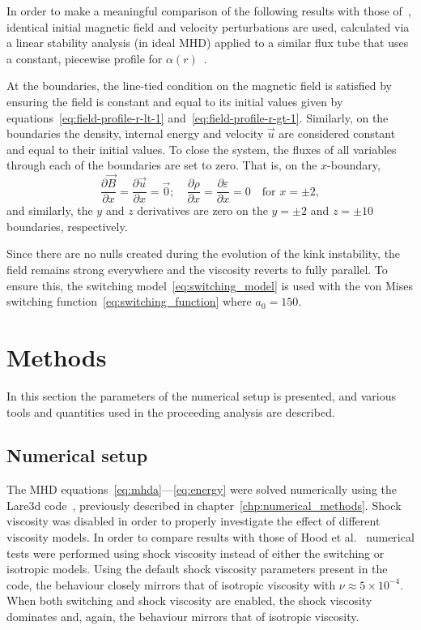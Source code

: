 In order to make a meaningful comparison of the following results with those of~\cite{hoodCoronalHeatingMagnetic2009}, identical initial magnetic field and velocity perturbations are used, calculated via a linear stability analysis (in ideal MHD) applied to a similar flux tube that uses a constant, piecewise profile for $\alpha(r)$~\cite{vanderlindenCompleteCoronalLoop1999,browningSolarCoronalHeating2003c,browningHeatingCoronaNanoflares2008a}.

At the boundaries, the line-tied condition on the magnetic field is satisfied by ensuring the field is constant and equal to its initial values given by equations~\eqref{eq:field-profile-r-lt-1} and~\eqref{eq:field-profile-r-gt-1}. Similarly, on the boundaries the density, internal energy and velocity $\vec{u}$ are considered constant and equal to their initial values. To close the system, the fluxes of all variables through each of the boundaries are set to zero. That is, on the $x$-boundary,
\begin{equation}
  \frac{\partial \vec{B}}{\partial x} = \frac{\partial \vec{u}}{\partial x} = \vec{0}; \quad \frac{\partial \rho}{\partial x} = \frac{\partial \varepsilon}{\partial x} = 0 \quad \text{for } x=\pm 2,
\end{equation}
and similarly, the $y$ and $z$ derivatives are zero on the $y=\pm2$ and $z=\pm10$ boundaries, respectively.

Since there are no nulls created during the evolution of the kink instability, the field remains strong everywhere and the viscosity reverts to fully parallel. To ensure this, the switching model~\eqref{eq:switching_model} is used with the von Mises switching function~\eqref{eq:switching_function} where $a_0 = 150$. 

\section{Methods}
\label{sec:general-numerical-setup}

In this section the parameters of the numerical setup is presented, and various tools and quantities used in the proceeding analysis are described.

\subsection{Numerical setup}

The MHD equations~\eqref{eq:mhda}---\eqref{eq:energy} were solved numerically using the Lare3d code~\cite{arberStaggeredGridLagrangian2001}, previously described in chapter~\ref{chp:numerical_methods}. Shock viscosity was disabled in order to properly investigate the effect of different viscosity models. In order to compare results with those of Hood et al.~\cite{hoodCoronalHeatingMagnetic2009} numerical tests were performed using shock viscosity instead of either the switching or isotropic models. Using the default shock viscosity parameters present in the code, the behaviour closely mirrors that of isotropic viscosity with $\nu\approx 5\times10^{-4}$. When both switching and shock viscosity are enabled, the shock viscosity dominates and, again, the behaviour mirrors that of isotropic viscosity.

